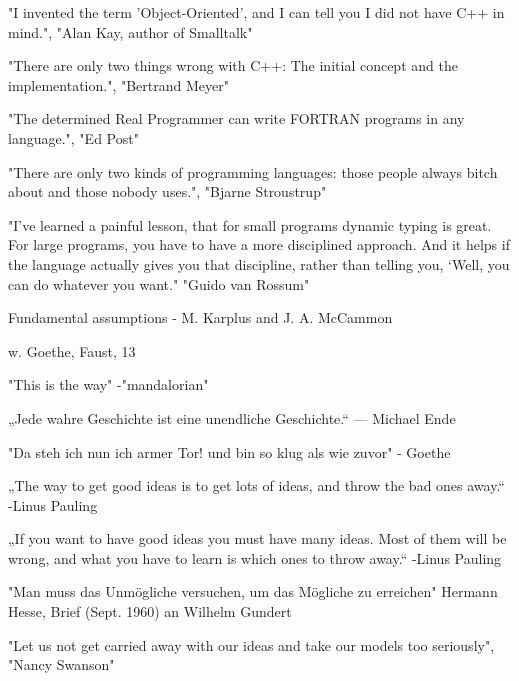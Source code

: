 "I invented the term 'Object-Oriented', and I can tell you I did not have C++ in mind.",
          "Alan Kay, author of Smalltalk"
          
"There are only two things wrong with C++:  The initial concept and the implementation.",
          "Bertrand Meyer"
      
"The determined Real Programmer can write FORTRAN programs in any language.", "Ed Post"

"There are only two kinds of programming languages: those people always bitch about and those nobody uses.",
          "Bjarne Stroustrup" 
          
 "I’ve learned a painful lesson, that for small programs dynamic typing is great. For large programs, you have to have a more disciplined approach. And it helps if the language actually gives you that discipline, rather than telling you, ‘Well, you can do whatever you want." "Guido van Rossum"         
          
{Fundamental assumptions - M. Karplus  and J. A. McCammon \cite{Karplus2002}}




{w. Goethe, Faust, 13 }

"This is the way" -"mandalorian"

„Jede wahre Geschichte ist eine unendliche Geschichte.“ — Michael Ende

"Da steh ich nun ich armer Tor! und bin so klug als wie zuvor" - Goethe




„The way to get good ideas is to get lots of ideas, and throw the bad ones away.“
-Linus Pauling

„If you want to have good ideas you must have many ideas. Most of them will be wrong, and what you have to learn is which ones to throw away.“
-Linus Pauling

"Man muss das Unmögliche versuchen, um das Mögliche zu erreichen"
Hermann Hesse, Brief (Sept. 1960) an Wilhelm Gundert

"Let us not get carried away with our ideas and take our models too seriously",
          "Nancy Swanson"